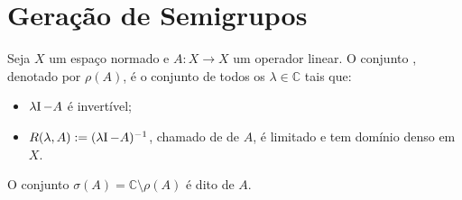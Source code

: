 \section{Geração de Semigrupos}

\begin{definition}
Seja $X$ um espaço normado e $A:X\longrightarrow X$ um operador linear. O conjunto ,  denotado por $\rho(A)$, é o conjunto de todos os $\lambda\in \mathbb{C}$ tais que:
\begin{itemize}
    \item $\lambda \operatorname{\!I} -A$ é invertível;
    \item $R(\lambda,A):=(\lambda \operatorname{\!I} -A)^{-1}$, chamado de   de $A$, é limitado e tem domínio denso em $X$.
\end{itemize}
O conjunto $\sigma(A)=\mathbb{C}\setminus\rho(A)$ é dito   de $A$.

\end{definition}